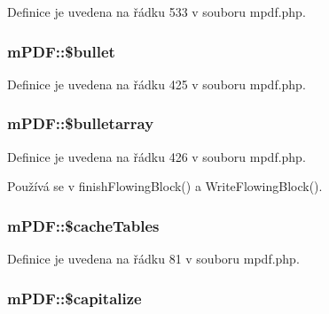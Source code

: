 Definice je uvedena na řádku 533 v souboru mpdf.\-php.

\hypertarget{classm_p_d_f_adfef9b11fb49b034b1cd420fb6c13d78}{
\subsubsection[{\$bullet}]{\setlength{\rightskip}{0pt plus 5cm}m\-P\-D\-F\-::\$bullet}}\label{classm_p_d_f_adfef9b11fb49b034b1cd420fb6c13d78}


Definice je uvedena na řádku 425 v souboru mpdf.\-php.

\hypertarget{classm_p_d_f_aa7a350f64478df33ae5165750fd7863c}{
\subsubsection[{\$bulletarray}]{\setlength{\rightskip}{0pt plus 5cm}m\-P\-D\-F\-::\$bulletarray}}\label{classm_p_d_f_aa7a350f64478df33ae5165750fd7863c}


Definice je uvedena na řádku 426 v souboru mpdf.\-php.



Používá se v finish\-Flowing\-Block() a Write\-Flowing\-Block().

\hypertarget{classm_p_d_f_a9772ecac0ffad6d90e0c3cb2576c2b9a}{
\subsubsection[{\$cache\-Tables}]{\setlength{\rightskip}{0pt plus 5cm}m\-P\-D\-F\-::\$cache\-Tables}}\label{classm_p_d_f_a9772ecac0ffad6d90e0c3cb2576c2b9a}


Definice je uvedena na řádku 81 v souboru mpdf.\-php.

\hypertarget{classm_p_d_f_a060f03be66dc148a5ed8f4e3c371dc28}{
\subsubsection[{\$capitalize}]{\setlength{\rightskip}{0pt plus 5cm}m\-P\-D\-F\-::\$capitalize}}\label{classm_p_d_f_a060f03be66dc148a5ed8f4e3c371dc28}


